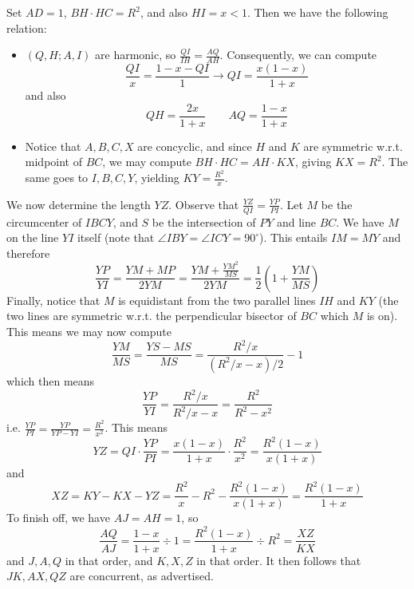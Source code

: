 \documentclass[11pt,a4paper]{article}
\begin{document}
\begin{enumerate}
    	Set $AD = 1$, 
    	$BH\cdot HC = R^2$, 
    	and also $HI = x < 1$. 
    	Then we have the following relation: 
    	\begin{itemize}
    		\item $(Q, H; A, I)$ are harmonic, 
    		so $\frac{QI}{IH} = \frac{AQ}{AH}$. 
    		Consequently, 
    		we can compute 
    		\[
    		\frac{QI}{x} = \frac{1 - x - QI}{1}
    		\to QI = \frac{x(1 - x)}{1 + x}
    		\]
    		and also 
    		\[
    		QH = \frac{2x}{1 + x}
    		\qquad 
    		AQ = \frac{1 - x}{1 + x}
    		\]
    		
    		\item Notice that $A, B, C, X$ are concyclic, 
    		and since $H$ and $K$ are symmetric w.r.t. midpoint of $BC$, 
    		we may compute $BH\cdot HC = AH\cdot KX$, 
    		giving $KX = R^2$. 
    		The same goes to $I, B, C, Y$, 
    		yielding $KY = \frac{R^2}{x}$. 
    	\end{itemize}
    	
    	We now determine the length $YZ$. 
    	Observe that $\frac{YZ}{QI} = \frac{YP}{PI}$. 
    	Let $M$ be the circumcenter of $IBCY$, and $S$ be the intersection of $PY$ and line $BC$. 
    	We have $M$ on the line $YI$ itself 
    	(note that $\angle IBY = \angle ICY = 90^{\circ}$). 
    	This entails $IM=MY$ and therefore 
    	\[
    	\frac{YP}{YI}
    	=\frac{YM + MP}{2YM}
    	=\frac{YM + \frac{YM^2}{MS}}{2YM}
    	=\frac 12 \left(1 + \frac{YM}{MS}\right)
    	\]
    	Finally, notice that $M$ is equidistant from the two parallel lines $IH$ and $KY$ (the two lines are symmetric w.r.t. the perpendicular bisector of $BC$ which $M$ is on). 
    	This means we may now compute 
    	\[
    	\frac{YM}{MS}
    	=\frac{YS - MS}{MS}
    	=\frac{R^2/x}{(R^2/x - x) / 2} - 1
    	\]
    	which then means 
    	\[
    	\frac{YP}{YI} = \frac{R^2/x}{R^2/x - x}
    	=\frac{R^2}{R^2 - x^2}
    	\]
    	i.e. $\frac{YP}{PI} = \frac{YP}{YP - YI} = \frac{R^2}{x^2}$. 
    	This means 
    	\[
    	YZ = QI \cdot \frac{YP}{PI}
    	=\frac{x(1 - x)}{1 + x}\cdot  \frac{R^2}{x^2}
    	= \frac{R^2(1 - x)}{x(1+x)}
    	\]
    	and 
    	\[
    	XZ
    	= KY - KX - YZ
    	= \frac{R^2}{x} - R^2 - \frac{R^2(1 - x)}{x(1+x)}
    	=\frac{R^2(1 - x)}{1 + x}
    	\]
    	To finish off, we have $AJ = AH = 1$, so 
    	\[
    	\frac{AQ}{AJ} = \frac{1 - x}{ 1 + x}\div 1
    	=\frac{R^2(1 - x)}{1 + x}\div R^2
    	=\frac{XZ}{KX}
    	\]
    	and $J, A, Q$ in that order, 
    	and $K, X, Z$ in that order. 
    	It then follows that $JK, AX, QZ$ are concurrent, as advertised. 
    	

\end{enumerate}
\end{document}

